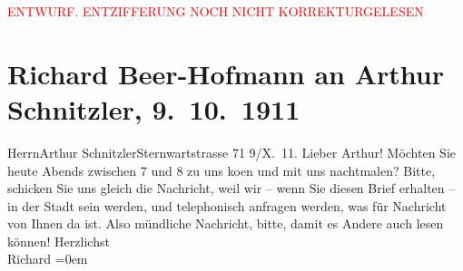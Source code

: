 
\begin{center}
            \textcolor{red}{ENTWURF. ENTZIFFERUNG NOCH NICHT KORREKTURGELESEN}
                      \end{center}
            
               \section[Richard Beer-Hofmann an Arthur Schnitzler, 9. 10. 1911]{ Richard Beer-Hofmann an Arthur Schnitzler,
               9. 10. 1911}\nopagebreak{}\rehead{ }\begin{ledgroupsized}[t]{13cm}\normalsize\beginnumbering{} \toendnotes[C]{\smallbreak\pagebreak[2]} 
\pstart{}{\pb}Herrn\pend{}\pstart{}Arthur Schnitzler\pend{}\pstart{}Sternwartstrasse 71\pend{}{\bigskip}\pstart
           \raggedleft{}{\pb}9/X. 11.\pend
           \pstart
           Lieber Arthur! Möchten Sie heute{ }Abends zwischen 7 und 8 zu uns ko{\geminationm}en und mit uns nachtmalen? Bitte, schicken Sie uns
               gleich die Nachricht, weil wir – wenn Sie diesen Brief erhalten – in der Stadt sein
               werden, und telephonisch an{\pb}fragen
               werden, was für Nachricht von Ihnen da ist. Also mündliche Nachricht, bitte, damit es
               Andere auch lesen können!\pend
           \pstart
           Herzlichst{\\[\baselineskip]}\spacefill\mbox{Richard}\pend
           \leftskip=0em{}\endnumbering{}\end{ledgroupsized}  \newcommand{\dateiname}{L02034}\newcommand{\titel}{Richard Beer-Hofmann an Arthur Schnitzler, 9. 10. 1911}\newcommand{\editorInnen}{Martin Anton Müller und Gerd-Hermann Susen}
      